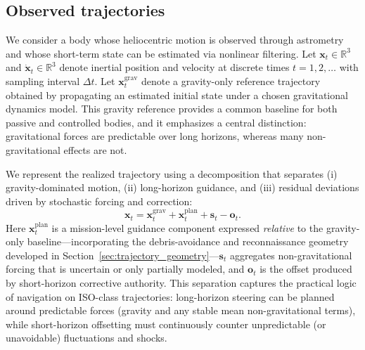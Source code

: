 \documentclass{article}
\begin{document}
\subsection{Observed trajectories}

We consider a body whose heliocentric motion is observed through astrometry and whose short-term state can be estimated via nonlinear filtering. Let $\mathbf{x}_t\in\mathbb{R}^3$ and $\dot{\mathbf{x}}_t\in\mathbb{R}^3$ denote inertial position and velocity at discrete times $t=1,2,\dots$ with sampling interval $\Delta t$. Let $\mathbf{x}^{\mathrm{grav}}_t$ denote a gravity-only reference trajectory obtained by propagating an estimated initial state under a chosen gravitational dynamics model. This gravity reference provides a common baseline for both passive and controlled bodies, and it emphasizes a central distinction: gravitational forces are predictable over long horizons, whereas many non-gravitational effects are not.

We represent the realized trajectory using a decomposition that separates (i) gravity-dominated motion, (ii) long-horizon guidance, and (iii) residual deviations driven by stochastic forcing and correction:
\begin{equation}
\mathbf{x}_t
=
\mathbf{x}^{\mathrm{grav}}_t
+
\mathbf{x}^{\mathrm{plan}}_t
+
\mathbf{s}_t
-
\mathbf{o}_t .
\label{eq:master_decomp}
\end{equation}
Here $\mathbf{x}^{\mathrm{plan}}_t$ is a mission-level guidance component expressed \emph{relative} to the gravity-only baseline---incorporating the debris-avoidance and reconnaissance geometry developed in Section~\ref{sec:trajectory_geometry}---$\mathbf{s}_t$ aggregates non-gravitational forcing that is uncertain or only partially modeled, and $\mathbf{o}_t$ is the offset produced by short-horizon corrective authority. This separation captures the practical logic of navigation on ISO-class trajectories: long-horizon steering can be planned around predictable forces (gravity and any stable mean non-gravitational terms), while short-horizon offsetting must continuously counter unpredictable (or unavoidable) fluctuations and shocks.
\end{document}
